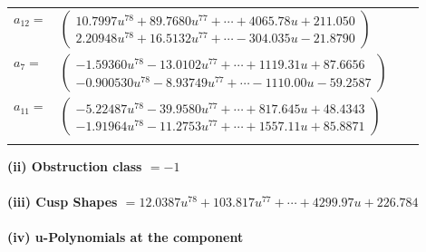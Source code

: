 \documentclass[1p]{elsarticle_modified}
\theoremstyle{definition}
\begin{document}
\begin{tabular}{m{7pt} m{180pt} m{7pt} m{180pt} }
\flushright $a_{12}=$&$\begin{pmatrix}10.7997 u^{78}+89.7680 u^{77}+\cdots+4065.78 u+211.050\\2.20948 u^{78}+16.5132 u^{77}+\cdots-304.035 u-21.8790\end{pmatrix}$ \\
\flushright $a_{7}=$&$\begin{pmatrix}-1.59360 u^{78}-13.0102 u^{77}+\cdots+1119.31 u+87.6656\\-0.900530 u^{78}-8.93749 u^{77}+\cdots-1110.00 u-59.2587\end{pmatrix}$ \\
\flushright $a_{11}=$&$\begin{pmatrix}-5.22487 u^{78}-39.9580 u^{77}+\cdots+817.645 u+48.4343\\-1.91964 u^{78}-11.2753 u^{77}+\cdots+1557.11 u+85.8871\end{pmatrix}$\\&\end{tabular}
\flushleft \textbf{(ii) Obstruction class $= -1$}\\~\\
\flushleft \textbf{(iii) Cusp Shapes $= 12.0387 u^{78}+103.817 u^{77}+\cdots+4299.97 u+226.784$}\\~\\
\newpage\renewcommand{\arraystretch}{1}
\flushleft \textbf{(iv) u-Polynomials at the component}\newline \\
\end{document}
